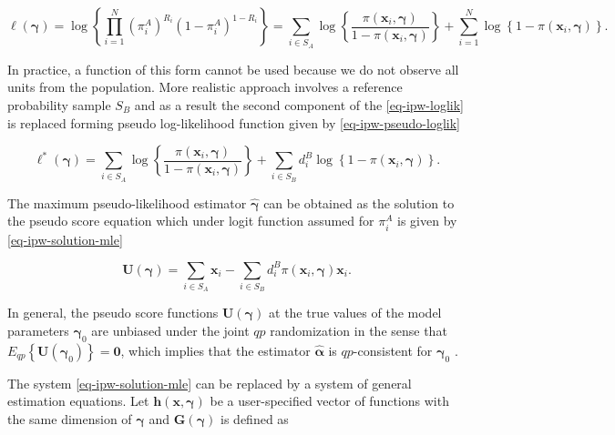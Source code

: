 \documentclass[
]{jss}
\begin{document}
\begin{equation}
\ell(\boldsymbol{\gamma}) = \log\left\{\prod_{i=1}^N \left(\pi_i^A\right)^{R_i}\left(1-\pi_i^A\right)^{1-R_i}\right\} =
\sum_{i \in S_{A}} \log \left\{\frac{\pi\left(\boldsymbol{x}_i, \boldsymbol{\gamma}\right)}{1-\pi\left(\boldsymbol{x}_i, \boldsymbol{\gamma}\right)}\right\}+\sum_{i=1}^N \log \left\{1-\pi\left(\boldsymbol{x}_i, \boldsymbol{\gamma}\right)\right\}.
\label{eq-ipw-loglik}
\end{equation}

In practice, a function of this form cannot be used because we do not
observe all units from the population. More realistic approach involves
a reference probability sample \(S_B\) and as a result the second
component of the \eqref{eq-ipw-loglik} is replaced forming pseudo
log-likelihood function given by \eqref{eq-ipw-pseudo-loglik}

\begin{equation}
\ell^*(\boldsymbol{\gamma}) = \sum_{i \in S_{A}} \log \left\{\frac{\pi\left(\boldsymbol{x}_i, \boldsymbol{\gamma}\right)}{1-\pi\left(\boldsymbol{x}_i, \boldsymbol{\gamma}\right)}\right\}+ \sum_{i \in S_{B}} d_i^B \log \left\{1-\pi\left(\boldsymbol{x}_i, \boldsymbol{\gamma}\right)\right\}.
\label{eq-ipw-pseudo-loglik}
\end{equation}

The maximum pseudo-likelihood estimator \(\hat{\boldsymbol{\gamma}}\)
can be obtained as the solution to the pseudo score equation which under
logit function assumed for \(\pi_i^A\) is given by
\eqref{eq-ipw-solution-mle}

\begin{equation}
\boldsymbol{U}(\boldsymbol{\gamma}) = \sum_{i \in S_A} \boldsymbol{x}_i - \sum_{i \in S_B} d_i^B \pi(\boldsymbol{x}_i, \boldsymbol{\gamma}) \boldsymbol{x}_i.
\label{eq-ipw-solution-mle}
\end{equation}

In general, the pseudo score functions
\(\boldsymbol{U}(\boldsymbol{\gamma})\) at the true values of the model
parameters \(\boldsymbol{\gamma}_0\) are unbiased under the joint
\(q p\) randomization in the sense that
\(E_{q p}\left\{\boldsymbol{U}\left(\boldsymbol{\gamma}_0\right)\right\}=\boldsymbol{0}\),
which implies that the estimator \(\hat{\boldsymbol{\alpha}}\) is
\(qp\)-consistent for \(\boldsymbol{\gamma}_0\)
\citep{wu2022statistical}.

The system \eqref{eq-ipw-solution-mle} can be replaced by a system of
general estimation equations. Let
\(\boldsymbol{h}(\boldsymbol{x}, \boldsymbol{\gamma})\) be a
user-specified vector of functions with the same dimension of
\(\boldsymbol{\gamma}\) and \(\boldsymbol{G}(\boldsymbol{\gamma})\) is
defined as
\end{document}
